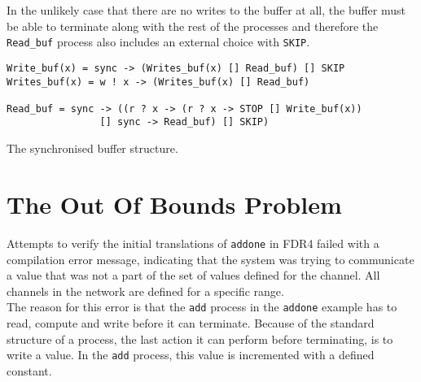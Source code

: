 In the unlikely case that there are no writes to the buffer at all, the buffer must be able to terminate along with the rest of the processes and therefore the \texttt{Read\_buf} process also includes an external choice with \texttt{SKIP}.

\begin{listing}
\begin{verbatim}
Write_buf(x) = sync -> (Writes_buf(x) [] Read_buf) [] SKIP
Writes_buf(x) = w ! x -> (Writes_buf(x) [] Read_buf)

Read_buf = sync -> ((r ? x -> (r ? x -> STOP [] Write_buf(x))
                [] sync -> Read_buf) [] SKIP)
\end{verbatim}
\caption{The synchronised buffer structure.}
\label{lst:buffer}
\end{listing}

\section{The Out Of Bounds Problem}
Attempts to verify the initial \cspm{} translations of \texttt{addone} in FDR4 failed with a compilation error message, indicating that the system was trying to communicate a value that was not a part of the set of values defined for the channel. All channels in the network are defined for a specific range. \\

The reason for this error is that the \texttt{add} process in the \texttt{addone} example has to read, compute and write before it can terminate. Because of the standard structure of a process, the last action it can perform before terminating, is to write a value. In the \texttt{add} process, this value is incremented with a defined constant.\\

